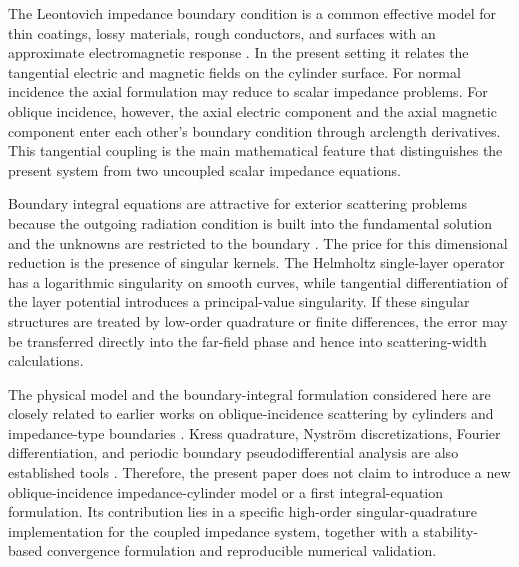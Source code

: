 \documentclass[11pt]{article}
\numberwithin{equation}{section}
\begin{document}
The Leontovich impedance boundary condition is a common effective model for thin coatings, lossy materials, rough conductors, and surfaces with an approximate electromagnetic response \cite{senior1995}. In the present setting it relates the tangential electric and magnetic fields on the cylinder surface. For normal incidence the axial formulation may reduce to scalar impedance problems. For oblique incidence, however, the axial electric component and the axial magnetic component enter each other's boundary condition through arclength derivatives. This tangential coupling is the main mathematical feature that distinguishes the present system from two uncoupled scalar impedance equations.

Boundary integral equations are attractive for exterior scattering problems because the outgoing radiation condition is built into the fundamental solution and the unknowns are restricted to the boundary \cite{colton1983,mclean2000,nedelec2001,sauter2011}. The price for this dimensional reduction is the presence of singular kernels. The Helmholtz single-layer operator has a logarithmic singularity on smooth curves, while tangential differentiation of the layer potential introduces a principal-value singularity. If these singular structures are treated by low-order quadrature or finite differences, the error may be transferred directly into the far-field phase and hence into scattering-width calculations.

The physical model and the boundary-integral formulation considered here are closely related to earlier works on oblique-incidence scattering by cylinders and impedance-type boundaries \cite{wang2012,tsalamengas2007,akduman2003,gintides2020,mindrinos2018,gintides2017}. Kress quadrature, Nystr\"om discretizations, Fourier differentiation, and periodic boundary pseudodifferential analysis are also established tools \cite{kress1995,kress2014,atkinson1997,saranen2002}. Therefore, the present paper does not claim to introduce a new oblique-incidence impedance-cylinder model or a first integral-equation formulation. Its contribution lies in a specific high-order singular-quadrature implementation for the coupled impedance system, together with a stability-based convergence formulation and reproducible numerical validation.
\end{document}
